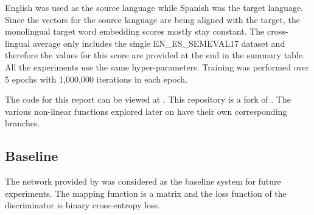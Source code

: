 \documentclass[11pt]{article}
\begin{document}
English was used as the source language while Spanish was the target language. Since the vectors for the source language are being aligned with the target, the monolingual target word embedding scores mostly stay constant. The cross-lingual average only includes the single EN\_ES\_SEMEVAL17 dataset and therefore the values for this score are provided at the end in the summary table. All the experiments use the same hyper-parameters. Training was performed over 5 epochs with 1,000,000 iterations in each epoch.

The code for this report can be viewed at \cite{muserepomine}. This repository is a fork of \cite{muserepo}. The various non-linear functions explored later on have their own corresponding branches.

\subsection{Baseline} \label{baseline}
The network provided by \cite{muserepo} was considered as the baseline system for future experiments. The mapping function is a matrix and the loss function of the discriminator is binary cross-entropy loss.
\end{document}
